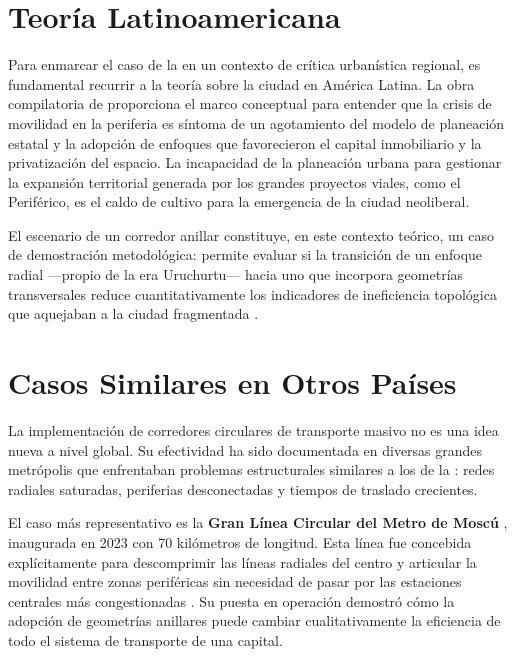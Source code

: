 
\section{Teoría Latinoamericana}
\label{sec:teoria-latinoamericana}

Para enmarcar el caso de la \cdmx{} en un contexto de crítica urbanística
regional, es fundamental recurrir a la teoría sobre la ciudad en América Latina.
La obra compilatoria de \citet{padilla2007} proporciona el marco conceptual para
entender que la crisis de movilidad en la periferia es síntoma de un agotamiento
del modelo de planeación estatal y la adopción de enfoques que favorecieron el
capital inmobiliario y la privatización del espacio. La incapacidad de la
planeación urbana para gestionar la expansión territorial generada por los
grandes proyectos viales, como el Periférico, es el caldo de cultivo para la
emergencia de la ciudad neoliberal.

El escenario de un corredor anillar constituye, en este contexto teórico, un
caso de demostración metodológica: permite evaluar si la transición de un
enfoque radial ---propio de la era Uruchurtu--- hacia uno que incorpora
geometrías transversales reduce cuantitativamente los indicadores de
ineficiencia topológica que aquejaban a la ciudad fragmentada
\citep{franco2022}.

\section{Casos Similares en Otros Países}
\label{sec:casos-similares}

La implementación de corredores circulares de transporte masivo no es una idea
nueva a nivel global. Su efectividad ha sido documentada en diversas grandes
metrópolis que enfrentaban problemas estructurales similares a los de la
\cdmx{} : redes radiales saturadas, periferias desconectadas y tiempos de
traslado crecientes.

El caso más representativo es la
\textbf{Gran Línea Circular del Metro de Moscú} , inaugurada en 2023 con 70
kilómetros de longitud. Esta línea fue concebida explícitamente para
descomprimir las líneas radiales del centro y articular la movilidad entre zonas
periféricas sin necesidad de pasar por las estaciones centrales más
congestionadas \citep{efe2023}. Su puesta en operación demostró cómo la adopción
de geometrías anillares puede cambiar cualitativamente la eficiencia de todo el
sistema de transporte de una capital.

